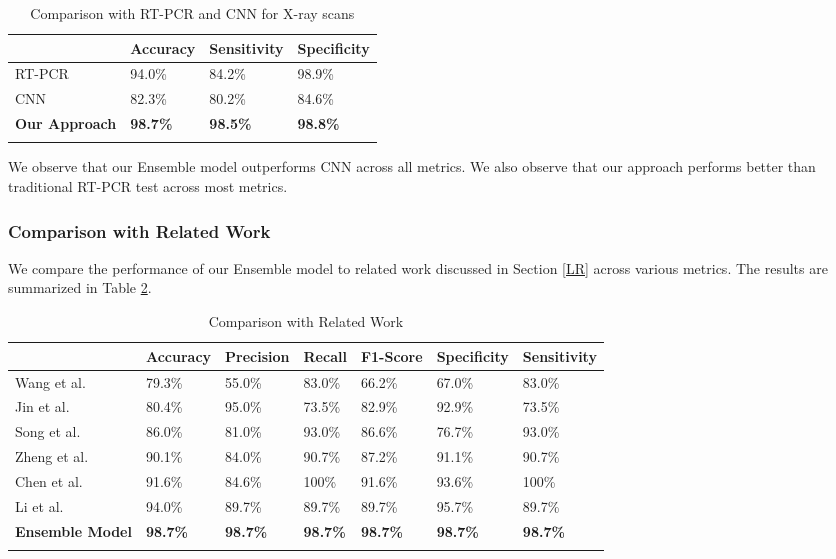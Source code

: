 \begin{longtable}{| p{} | p{} |  p{} |   p{} |} 
    \hline
& \textbf{Accuracy} & \textbf{Sensitivity} & \textbf{Specificity} \\
\hline

			RT-PCR      &94.0\%   &84.2\%    &98.9\%  
\\\hline
			CNN    &82.3\%   &80.2\%    &84.6\% 
\\\hline
			\textbf{Our Approach}   &\textbf{98.7\%}   &\textbf{98.5\%}    &\textbf{98.8\%} 
\\\hline
 \caption{Comparison with RT-PCR and CNN for X-ray scans}  \label{tab:compCT}
    \end{longtable}
\vspace{-1em}

We observe that our Ensemble model outperforms CNN across all metrics. We also observe that our approach performs better than traditional RT-PCR test across most metrics.

\subsubsection{Comparison with Related Work}

We compare the performance of our Ensemble model to related work discussed in Section \ref{LR} across various metrics. The results are summarized in Table \ref{tab:relWorkCT}.


\vspace{1em}
 \begin{longtable}{| p{} |  p{} |   p{} | p{} | p{} | p{} | p{} |} 
    \hline
& \textbf{Accuracy} & \textbf{Precision} & \textbf{Recall} & \textbf{F1-Score} & \textbf{Specificity} & \textbf{Sensitivity} \\
\hline
Wang et al. \cite{WBX+2020} &79.3\%    &55.0\%     &83.0\%   &66.2\%    &67.0\%     &83.0\%
\\\hline
Jin et al. \cite{JCW+2020} &80.4\%    &95.0\%     &73.5\%   &82.9\%    &92.9\%     &73.5\%
\\\hline
Song et al. \cite{SZL+2020} &86.0\%    &81.0\%     &93.0\%   &86.6\%    &76.7\%     &93.0\%
\\\hline
Zheng et al. \cite{CXZ+2020}   &90.1\%    &84.0\%     &90.7\%   &87.2\%    &91.1\%     &90.7\%
\\\hline
Chen et al. \cite{CJL+2020}   &91.6\%    &84.6\%     &100\%   &91.6\%    &93.6\%     &100\%
\\\hline
Li et al. \cite{LLL+2020}   &94.0\%    &89.7\%     &89.7\%   &89.7\%    &95.7\%     &89.7\%
\\\hline
\textbf{Ensemble Model}    &\textbf{98.7\%}   &\textbf{98.7\%}    &\textbf{98.7\%}    &\textbf{98.7\%}   &\textbf{98.7\%}   &\textbf{98.7\%} 
\\\hline
 \caption{Comparison with Related Work}  \label{tab:relWorkCT}

    \end{longtable}
\vspace{-1em}


